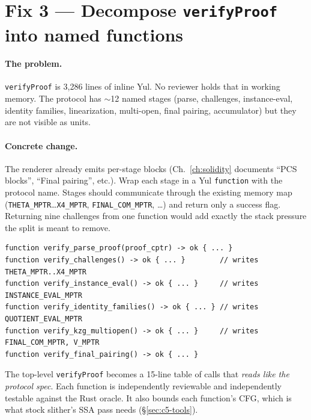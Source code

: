 \section{Fix 3 --- Decompose \texttt{verifyProof} into named functions}
\label{sec:read-decompose}

\paragraph{The problem.} \texttt{verifyProof} is 3{,}286 lines of inline
Yul. No reviewer holds that in working memory. The protocol has
$\sim$12 named stages (parse, challenges, instance-eval, identity
families, linearization, multi-open, final pairing, accumulator) but they
are not visible as units.

\paragraph{Concrete change.} The renderer already emits per-stage blocks
(Ch.~\ref{ch:solidity} documents ``PCS blocks'', ``Final pairing'',
etc.). Wrap each stage in a Yul \texttt{function} with the protocol name.
Stages should communicate through the existing memory map
(\texttt{THETA\_MPTR}\ldots\texttt{X4\_MPTR}, \texttt{FINAL\_COM\_MPTR},
\ldots) and return only a success flag. Returning nine challenges from one
function would add exactly the stack pressure the split is meant to remove.

\begin{lstlisting}[style=yul]
function verify_parse_proof(proof_cptr) -> ok { ... }
function verify_challenges() -> ok { ... }        // writes THETA_MPTR..X4_MPTR
function verify_instance_eval() -> ok { ... }     // writes INSTANCE_EVAL_MPTR
function verify_identity_families() -> ok { ... } // writes QUOTIENT_EVAL_MPTR
function verify_kzg_multiopen() -> ok { ... }     // writes FINAL_COM_MPTR, V_MPTR
function verify_final_pairing() -> ok { ... }
\end{lstlisting}

The top-level \texttt{verifyProof} becomes a 15-line table of calls that
\emph{reads like the protocol spec}. Each function is independently
reviewable and independently testable against the Rust oracle. It also
bounds each function's CFG, which is what stock slither's SSA pass needs
(\S\ref{sec:c5-tools}).

